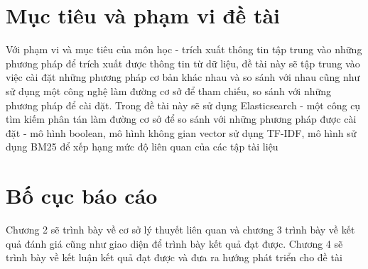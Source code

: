 \documentclass[../BTL.tex]{subfiles}
\begin{document}


\section{Mục tiêu và phạm vi đề tài}
\label{section:1.2}
Với phạm vi và mục tiêu của môn học - trích xuất thông tin tập trung vào những phương pháp để trích xuất được thông tin từ dữ liệu, đề tài này sẽ tập trung vào việc cài đặt những phương pháp cơ bản khác nhau và so sánh với nhau cũng như sử dụng một công nghệ làm đường cơ sở để tham chiếu, so sánh với những phương pháp để cài đặt. Trong đề tài này sẽ sử dụng Elasticsearch - một công cụ tìm kiếm phân tán làm đường cơ sở để so sánh với những phương pháp được cài đặt - mô hình boolean, mô hình không gian vector sử dụng TF-IDF, mô hình sử dụng BM25 để xếp hạng mức độ liên quan của các tập tài liệu

\section{Bố cục báo cáo}
\label{section:1.4}
Chương 2 sẽ trình bày về cơ sở lý thuyết liên quan và chương 3 trình bày về kết quả đánh giá cũng như giao diện để trình bày kết quả đạt được. Chương 4 sẽ trình bày về kết luận kết quả đạt được và đưa ra hướng phát triển cho đề tài
\end{document}
